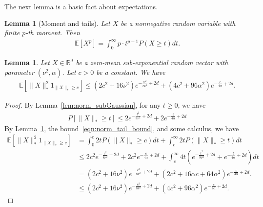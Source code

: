 \documentclass[11pt,twoside]{article}
\numberwithin{equation}{section}
\newcommand{\EE}{\mathbb{E}}
\newcommand{\RR}{\mathbb{R}}
\newcommand{\1}{\mathbf{1}}
\newtheorem{lemma}[theorem]{Lemma}
\theoremstyle{remark}
\theoremstyle{plain}
\begin{document}
The next lemma is a basic fact about expectations.
\begin{lemma}[Moment and tails]\label{lem: moment_and_tail}
	Let $X$ be a nonnegative random variable with finite $p$-th moment. Then
	\begin{align*}
		\EE[X^p] = \int_{0}^{\infty} p \cdot t^{p-1} P(X \ge t) dt.
	\end{align*}
\end{lemma}

\begin{lemma}\label{lem:truncted_second_moment_light_tail}
	Let $X \in \RR^d$ be a zero-mean sub-exponential random vector with parameter $(\nu^2,\alpha)$. Let $c > 0$ be a constant. We have
	\begin{align*}
		\EE[\|X\|_*^2 1_{\|X\|_* \ge c}] \le (2c^2+ 16 \nu^2) e^{-\frac{c^2}{8\nu^2} + 2d} + (4c^2+96\alpha^2)  e^{-\frac{c}{4\alpha} + 2d}.
	\end{align*}
\end{lemma}
\begin{proof}
	By Lemma~\ref{lem:norm_subGaussian}, for any $ t \ge 0$,  we have
	\begin{align}\label{eqn:norm_tail_bound}
		P[\|X\|_* \ge t] \le 2 e^{-\frac{t^2}{8\nu^2} + 2d} + 2 e^{-\frac{t}{4\alpha} + 2d}
	\end{align}
	By Lemma~\ref{lem: moment_and_tail}, the bound~\eqref{eqn:norm_tail_bound},  and some calculus, we have
	\begin{align*}
		\EE[\|X\|_*^2 1_{\|X\|_* \ge c}] &= \int_{0}^{c} 2t P(\|X\|_* \ge c) dt + \int_{c}^\infty 2tP(\|X\|_* \ge t) dt \\
		&\le  2c^2 e^{-\frac{c^2}{8\nu^2} + 2d} +  2c^2 e^{-\frac{c}{4\alpha} + 2d} + \int_{c}^{\infty}  4t (e^{-\frac{t^2}{8\nu^2} + 2d} +  e^{-\frac{t}{4\alpha} + 2d}) dt \\ 
		&= (2c^2 + 16\nu^2)  e^{-\frac{c^2}{8\nu^2} + 2d} + (2c^2+ 16 \alpha c+ 64\alpha^2)  e^{-\frac{c}{4\alpha} + 2d}.\\
		&\le (2c^2 + 16\nu^2)  e^{-\frac{c^2}{8\nu^2} + 2d} + (4c^2+ 96\alpha^2)  e^{-\frac{c}{4\alpha} + 2d}.
	\end{align*}
\end{proof}
\end{document}
